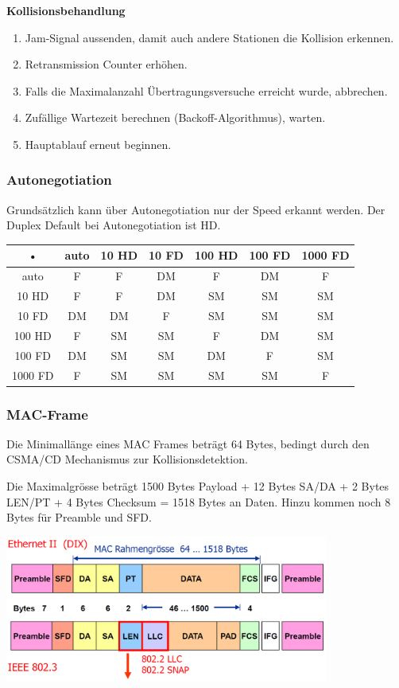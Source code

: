 \textbf{Kollisionsbehandlung}

\begin{enumerate}
	\item Jam-Signal aussenden, damit auch andere Stationen die Kollision erkennen.
	\item Retransmission Counter erhöhen.
	\item Falls die Maximalanzahl Übertragungsversuche erreicht wurde, abbrechen.
	\item Zufällige Wartezeit berechnen (Backoff-Algorithmus), warten.
	\item Hauptablauf erneut beginnen.
\end{enumerate}


\subsubsection{Autonegotiation}

Grundsätzlich kann über Autonegotiation nur der Speed erkannt werden. Der Duplex
Default bei Autonegotiation ist HD.

\begin{tabular}{|c|c|c|c|c|c|c|}
\hline 
• & auto & 10 HD & 10 FD & 100 HD & 100 FD & 1000 FD \\ 
\hline 
auto & F & F & DM & F & DM & F \\ 
\hline 
10 HD & F & F & DM & SM & SM & SM \\ 
\hline 
10 FD & DM & DM & F & SM & SM & SM \\ 
\hline 
100 HD & F & SM & SM & F & DM & SM \\ 
\hline 
100 FD & DM & SM & SM & DM & F & SM \\ 
\hline 
1000 FD & F & SM & SM & SM & SM & F \\ 
\hline 
\end{tabular} 


\subsubsection{MAC-Frame}

Die Minimallänge eines MAC Frames beträgt 64 Bytes, bedingt durch den CSMA/CD
Mechanismus zur Kollisionsdetektion.

Die Maximalgrösse beträgt 1500 Bytes Payload + 12 Bytes SA/DA + 2 Bytes LEN/PT +
4 Bytes Checksum = 1518 Bytes an Daten. Hinzu kommen noch 8 Bytes für Preamble
und SFD.

\begin{center}
	\includegraphics[width=0.8\textwidth]{media/MACFrame.png}
\end{center}

